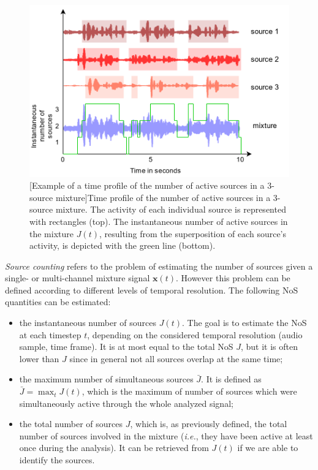 \begin{figure}[t]
    \begin{center}
    \includegraphics[width=0.8\linewidth]{Images/chap1/numberOfSources.png}
    [Example of a time profile of the number of active sources in a 3-source mixture]{Time profile of the number of active sources in a 3-source mixture. The activity of each individual source is represented with rectangles (top). The instantaneous number of active sources in the mixture $J(t)$, resulting from the superposition of each source's activity, is depicted with the green line (bottom).}
    \label{fig:numberOfSources}
    \end{center}
\end{figure}

\textit{Source counting} refers to the problem of estimating the number of sources given a single- or multi-channel mixture signal $\mathbf{x}(t)$. However this problem can be defined according to different levels of temporal resolution. The following NoS quantities can be estimated:

\begin{itemize}
    \item the instantaneous number of sources $J(t)$. The goal is to estimate the NoS at each timestep $t$, depending on the considered temporal resolution (audio sample, time frame). It is at most equal to the total NoS $J$, but it is often lower than $J$ since in general not all sources overlap at the same time;
    \item the maximum number of simultaneous sources $\bar{J}$. It is defined as $\bar{J} = \max_{t} J(t)$, which is the maximum of number of sources which were simultaneously active through the whole analyzed signal;
    \item the total number of sources $J$, which is, as previously defined, the total number of sources involved in the mixture (\textit{i.e.}, they have been active at least once during the analysis). It can be retrieved from $J(t)$ if we are able to identify the sources.
\end{itemize}

